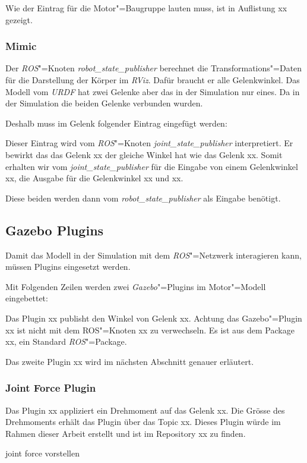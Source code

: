 Wie der Eintrag für die Motor"=Baugruppe lauten muss, ist in Auflistung xx gezeigt.

\subsubsection{Mimic}
Der \textit{ROS}"=Knoten \textit{robot\_state\_publisher} berechnet die Transformations"=Daten für die Darstellung der Körper im \textit{RViz}.
Dafür braucht er alle Gelenkwinkel.
Das Modell vom \textit{URDF} hat zwei Gelenke aber das in der Simulation nur eines.
Da in der Simulation die beiden Gelenke verbunden wurden.

Deshalb muss im Gelenk folgender Eintrag eingefügt werden: %

Dieser Eintrag wird vom \textit{ROS}"=Knoten \textit{joint\_state\_publisher} interpretiert.
Er bewirkt das das Gelenk xx der gleiche Winkel hat wie das Gelenk xx.
Somit erhalten wir vom \textit{joint\_state\_publisher} für die Eingabe von einem Gelenkwinkel xx, die Ausgabe für die Gelenkwinkel xx und xx.

Diese beiden werden dann vom \textit{robot\_state\_publisher} als Eingabe benötigt.

\subsection{Gazebo Plugins}
Damit das Modell in der Simulation mit dem \textit{ROS}"=Netzwerk interagieren kann, müssen Plugins eingesetzt werden.

Mit Folgenden Zeilen werden zwei \textit{Gazebo}"=Plugins im Motor"=Modell eingebettet:

Das Plugin xx publisht den Winkel von Gelenk xx.
Achtung das Gazebo"=Plugin xx ist nicht mit dem ROS"=Knoten xx zu verwechseln.
Es ist aus dem Package xx, ein Standard \textit{ROS}"=Package.

Das zweite Plugin xx wird im nächsten Abschnitt genauer erläutert.

\subsubsection{Joint Force Plugin}
Das Plugin xx appliziert ein Drehmoment auf das Gelenk xx.
Die Grösse des Drehmoments erhält das Plugin über das Topic xx.
Dieses Plugin würde im Rahmen dieser Arbeit erstellt und ist im Repository xx zu finden. 


joint force vorstellen

